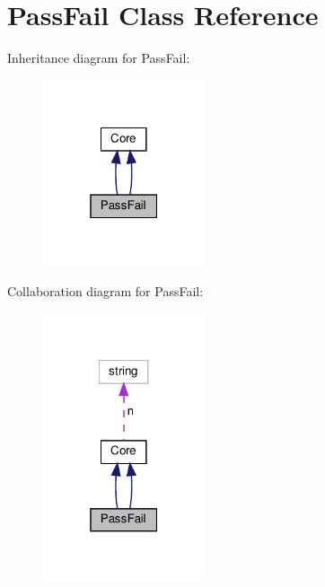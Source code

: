 \hypertarget{classPassFail}{}\section{Pass\+Fail Class Reference}
\label{classPassFail}


Inheritance diagram for Pass\+Fail\+:\nopagebreak
\begin{figure}[H]
\begin{center}
\leavevmode
\includegraphics[width=135pt]{classPassFail__inherit__graph}
\end{center}
\end{figure}


Collaboration diagram for Pass\+Fail\+:\nopagebreak
\begin{figure}[H]
\begin{center}
\leavevmode
\includegraphics[width=135pt]{classPassFail__coll__graph}
\end{center}
\end{figure}
